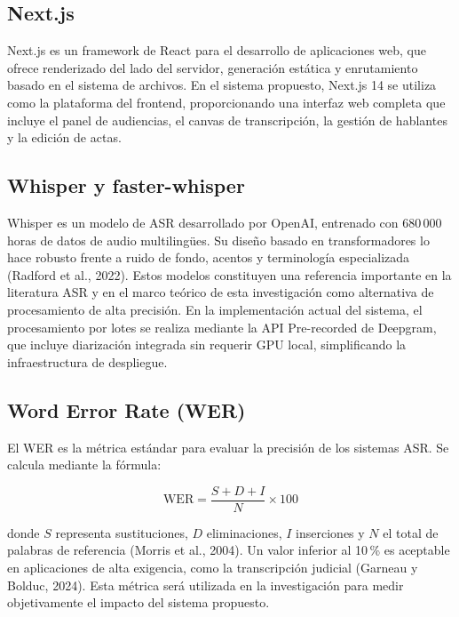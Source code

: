 \documentclass[12pt,a4paper,oneside]{report}
\begin{document}
\subsection{Next.js}

Next.js es un framework de React para el desarrollo de aplicaciones web, que ofrece renderizado del lado del servidor, generación estática y enrutamiento basado en el sistema de archivos. En el sistema propuesto, Next.js 14 se utiliza como la plataforma del frontend, proporcionando una interfaz web completa que incluye el panel de audiencias, el canvas de transcripción, la gestión de hablantes y la edición de actas.

\subsection{Whisper y faster-whisper}

Whisper es un modelo de ASR desarrollado por OpenAI, entrenado con 680\,000 horas de datos de audio multilingües. Su diseño basado en transformadores lo hace robusto frente a ruido de fondo, acentos y terminología especializada (Radford et al., 2022). Estos modelos constituyen una referencia importante en la literatura ASR y en el marco teórico de esta investigación como alternativa de procesamiento de alta precisión. En la implementación actual del sistema, el procesamiento por lotes se realiza mediante la API Pre-recorded de Deepgram, que incluye diarización integrada sin requerir GPU local, simplificando la infraestructura de despliegue.

\subsection{Word Error Rate (WER)}

El WER es la métrica estándar para evaluar la precisión de los sistemas ASR. Se calcula mediante la fórmula:

\begin{equation}
\text{WER} = \frac{S + D + I}{N} \times 100
\end{equation}

donde $S$ representa sustituciones, $D$ eliminaciones, $I$ inserciones y $N$ el total de palabras de referencia (Morris et al., 2004). Un valor inferior al 10\,\% es aceptable en aplicaciones de alta exigencia, como la transcripción judicial (Garneau y Bolduc, 2024). Esta métrica será utilizada en la investigación para medir objetivamente el impacto del sistema propuesto.
\end{document}
